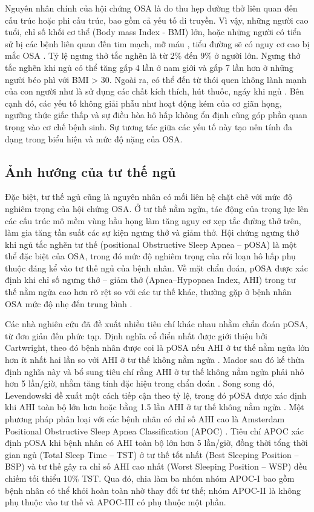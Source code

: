 Nguyên nhân chính của hội chứng OSA là do thu hẹp đường thở liên quan đến cấu
trúc hoặc phi cấu trúc, bao gồm cả yếu tố di truyền. Vì vậy, những người cao
tuổi, chỉ số khối cơ thể (Body mass Index - BMI) lớn, hoặc những người có tiển
sử bị các bệnh liên quan đến tim mạch, mỡ máu , tiểu đường sẽ có nguy cơ cao bị
mắc OSA \cite{wright1997health}. Tỷ lệ ngưng thở tắc nghẽn là từ 2\% đến 9\% ở
người lớn. Ngưng thở tắc nghẽn khi ngủ có thể tăng gấp 4 lần ở nam giới và gấp
7 lần hơn ở những người béo phì với BMI > 30. Ngoài ra, có thể đến từ thói quen
không lành mạnh của con người như là sử dụng các chất kích thích, hút thuốc,
ngáy khi ngủ \cite{reason_osa}\cite{reasonOsa}. Bên cạnh đó, các yếu tố không
giải phẫu như hoạt động kém của cơ giãn họng, ngưỡng thức giấc thấp và sự điều
hòa hô hấp không ổn định cũng góp phần quan trọng vào cơ chế bệnh sinh. Sự
tương tác giữa các yếu tố này tạo nên tính đa dạng trong biểu hiện và mức độ
nặng của OSA.

\subsection{Ảnh hướng của tư thế ngủ}

Đặc biệt, tư thế ngủ cũng là nguyên nhân có mối liên hệ chặt chẽ với mức độ nghiêm trọng của hội chứng OSA. Ở
tư thế nằm ngửa, tác động của trọng lực lên các cấu trúc mô mềm vùng hầu họng
làm tăng nguy cơ xẹp tắc đường thở trên, làm gia tăng tần suất các sự kiện
ngưng thở và giảm thở. Hội chứng ngưng thở khi ngủ tắc nghẽn tư thế (positional
Obstructive Sleep Apnea – pOSA) là một thể đặc biệt của OSA, trong đó mức độ
nghiêm trọng của rối loạn hô hấp phụ thuộc đáng kể vào tư thế ngủ của bệnh
nhân. Về mặt chẩn đoán, pOSA được xác định khi chỉ số ngưng thở – giảm thở
(Apnea–Hypopnea Index, AHI) trong tư thế nằm ngửa cao hơn rõ rệt so với các tư
thế khác, thường gặp ở bệnh nhân OSA mức độ nhẹ đến trung bình
\cite{heinzer2018,aloweidat2023positional}.

Các nhà nghiên cứu đã đề xuất nhiều tiêu chí khác nhau nhằm chẩn đoán pOSA, từ
đơn giản đến phức tạp. Định nghĩa cổ điển nhất được giới thiệu bởi Cartwright,
theo đó bệnh nhân được coi là pOSA nếu AHI ở tư thế nằm ngửa lớn hơn ít nhất
hai lần so với AHI ở tư thế không nằm ngửa \cite{cartwright1984position}. Mador
sau đó kế thừa định nghĩa này và bổ sung tiêu chí rằng AHI ở tư thế không nằm
ngửa phải nhỏ hơn 5 lần/giờ, nhằm tăng tính đặc hiệu trong chẩn đoán
\cite{mador2005prevalence}. Song song đó, Levendowski đề xuất một cách tiếp cận
theo tỷ lệ, trong đó pOSA được xác định khi AHI toàn bộ lớn hơn hoặc bằng 1.5
lần AHI ở tư thế không nằm ngửa \cite{levendowski2015neck}. Một phương pháp
phân loại với các bệnh nhân có chỉ số AHI cao là Amsterdam Positional
Obstructive Sleep Apnea Classification (APOC) \cite{frank2014positional}. Tiêu
chí APOC xác định pOSA khi bệnh nhân có AHI toàn bộ lớn hơn 5 lần/giờ, đồng
thời tổng thời gian ngủ (Total Sleep Time – TST) ở tư thế tốt nhất (Best
Sleeping Position – BSP) và tư thế gây ra chỉ số AHI cao nhất (Worst Sleeping
Position – WSP) đều chiếm tối thiểu 10\% TST. Qua đó, chia làm ba nhóm nhóm
APOC-I bao gồm bệnh nhân có thể khỏi hoàn toàn nhờ thay đổi tư thế; nhóm
APOC-II là không phụ thuộc vào tư thế và APOC-III có phụ thuộc một phần.

